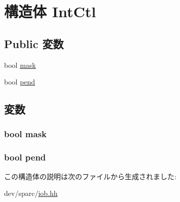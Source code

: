 \hypertarget{structIob_1_1IntCtl}{
\section{構造体 IntCtl}
\label{structIob_1_1IntCtl}
}
\subsection*{Public 変数}
\begin{DoxyCompactItemize}
\item 
bool \hyperlink{structIob_1_1IntCtl_aea8b125da73831a723cfb9a8ce48f2d7}{mask}
\item 
bool \hyperlink{structIob_1_1IntCtl_a25785cb4707ba60dc582f595ca6efc76}{pend}
\end{DoxyCompactItemize}


\subsection{変数}
\hypertarget{structIob_1_1IntCtl_aea8b125da73831a723cfb9a8ce48f2d7}{
\subsubsection[{mask}]{\setlength{\rightskip}{0pt plus 5cm}bool {\bf mask}}}
\label{structIob_1_1IntCtl_aea8b125da73831a723cfb9a8ce48f2d7}
\hypertarget{structIob_1_1IntCtl_a25785cb4707ba60dc582f595ca6efc76}{
\subsubsection[{pend}]{\setlength{\rightskip}{0pt plus 5cm}bool {\bf pend}}}
\label{structIob_1_1IntCtl_a25785cb4707ba60dc582f595ca6efc76}


この構造体の説明は次のファイルから生成されました:\begin{DoxyCompactItemize}
\item 
dev/sparc/\hyperlink{iob_8hh}{iob.hh}\end{DoxyCompactItemize}
